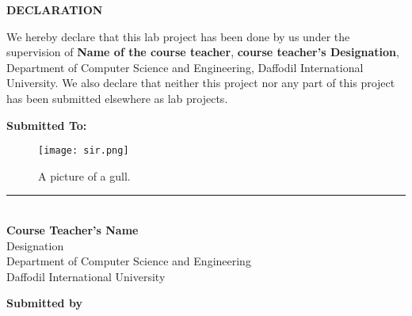 
\vspace*{1.5cm} 


\begin{center}
    {\LARGE \textbf{DECLARATION}}\\
\end{center}

\onehalfspacing

\noindent We hereby declare that this lab project has been done by us under the supervision of \textbf{Name of the course teacher}, \textbf{course teacher's Designation}, Department of Computer Science and Engineering, Daffodil International University. We also declare that neither this project nor any part of this project has been submitted elsewhere as lab projects. 

\vspace{.8cm}

\noindent \textbf{Submitted To:} \\[1cm]
\usepackage{graphicx}
\begin{figure}[h!]
  \caption{A picture of a gull.}
  \centering
  \texttt{[image: sir.png]}
\end{figure}
\noindent\rule{6cm}{0.4pt}\\
\textbf{Course Teacher's Name} \\
Designation \\
Department of Computer Science and Engineering \\
Daffodil International University \\

\vspace{.5cm}

\begin{center}
    \textbf{Submitted by}
\end{center}

\vspace{.2cm}

